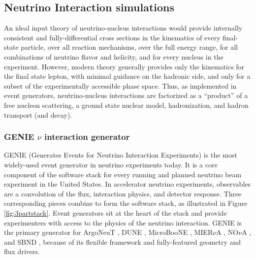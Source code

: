 \subsection{Neutrino Interaction simulations}

An ideal input theory of neutrino-nucleus interactions
 would provide internally consistent and fully-differential cross sections 
in the kinematics of every final-state particle, over all reaction mechanisms, over the full energy range, for all combinations of neutrino flavor and helicity, and for every nucleus in the experiment.
However, modern theory generally provides only the kinematics for the final state lepton, with minimal guidance on the hadronic side, and only for a subset of the experimentally accessible phase space.
Thus, as implemented in event generators, neutrino-nucleus interactions are factorized as a ``product'' of a free nucleon scattering, a ground state nuclear model, hadronization, and hadron transport (and decay).

\subsubsection{GENIE $\nu$ interaction generator}

GENIE (Generates Events for Neutrino Interaction Experiments) \cite{Andreopoulos:2009rq} is the most widely-used event generator in neutrino experiments today.
It is a core component of the software stack for every running and planned neutrino beam experiment in the United States.
In accelerator neutrino experiments, observables are a convolution of the flux, interaction physics, and detector response. 
Three corresponding pieces combine to form the software stack, as illustrated in Figure \ref{fig:3partstack}.
Event generators sit at the heart of the stack and provide experimenters with access to the physics of the neutrino interaction.
GENIE is the primary generator for ArgoNeuT \cite{refargoneut}, DUNE \cite{refdune}, MicroBooNE \cite{refmicroboone}, MIER$\nu$A \cite{refminerva}, NO$\nu$A \cite{refnova}, and SBND \cite{refsbnd}, because of its flexible framework and fully-featured geometry and flux drivers.

